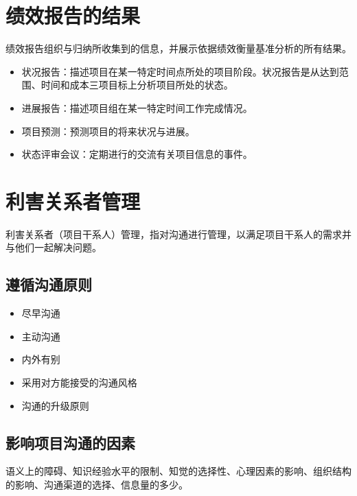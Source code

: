 \section{绩效报告的结果}
绩效报告组织与归纳所收集到的信息，并展示依据绩效衡量基准分析的所有结果。 
\begin{itemize}
	\item 状况报告：描述项目在某一特定时间点所处的项目阶段。状况报告是从达到范围、时间和成本三项目标上分析项目所处的状态。 
	\item 进展报告：描述项目组在某一特定时间工作完成情况。 
	\item 项目预测：预测项目的将来状况与进展。 
	\item 状态评审会议：定期进行的交流有关项目信息的事件。
\end{itemize}
\section{利害关系者管理}
利害关系者（项目干系人）管理，指对沟通进行管理，以满足项目干系人的需求并与他们一起解决问题。
\subsection{遵循沟通原则}
\begin{itemize}
	\item 尽早沟通
	\item 主动沟通
	\item 内外有别
	\item 采用对方能接受的沟通风格 
	\item 沟通的升级原则
\end{itemize}
\subsection{影响项目沟通的因素}
语义上的障碍、知识经验水平的限制、知觉的选择性、心理因素的影响、组织结构的影响、沟通渠道的选择、信息量的多少。
